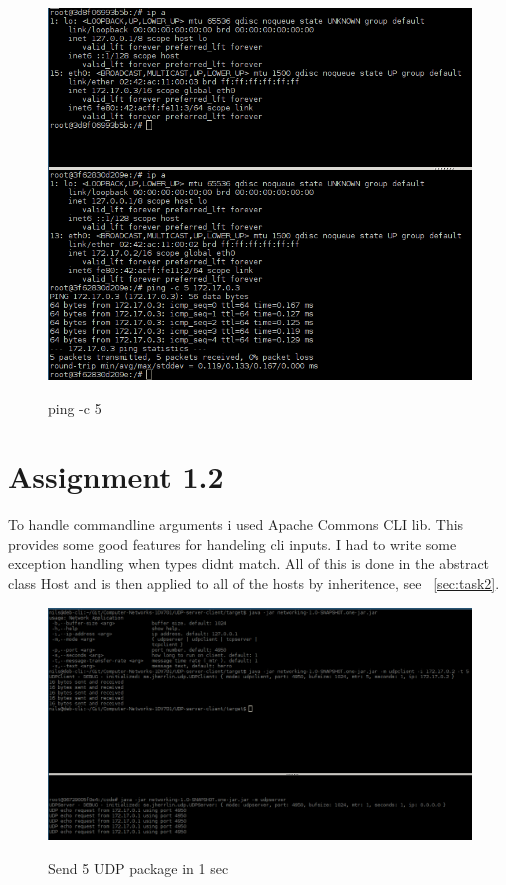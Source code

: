 \documentclass[a4paper,12pt]{article} %
\begin{document}
{\begin{figure}[H]
    \centering  
    \includegraphics[scale=0.5]{img/assignment11.png}
	\label{fig:assignment11}
	\caption{ping -c 5}
\end{figure}



\section{Assignment 1.2}

To handle commandline arguments i used Apache Commons CLI lib.
This provides some good features for handeling cli inputs.
I had to write some exception handling when types didnt match.
All of this is done in the abstract class Host and is then applied to all
of the hosts by inheritence, see ~\ref{sec:task2}.

\begin{figure}[H]
    \centering  
    \includegraphics[scale=0.35]{img/assignment12.png}
	\label{fig:assignment12}
	\caption{Send 5 UDP package in 1 sec}
\end{figure}

}
\end{document}
